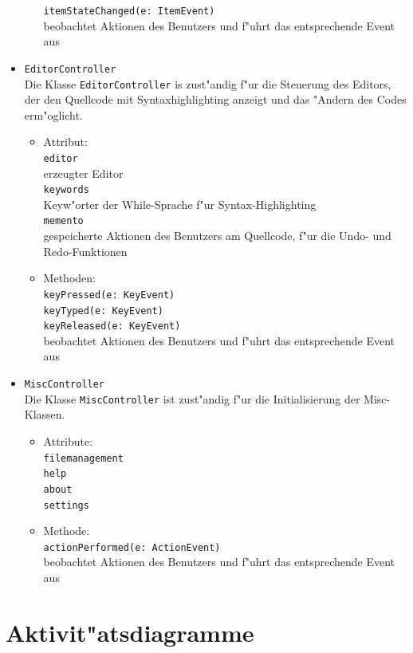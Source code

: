\documentclass[10pt,a4paper,titlepage]{article}
\begin{document}
\begin{itemize}
\begin{itemize}
\texttt{itemStateChanged(e: ItemEvent)} \\
beobachtet Aktionen des Benutzers und f"uhrt das entsprechende Event aus
\end{itemize}
\item \texttt{EditorController} \\
Die Klasse \texttt{EditorController} is zust"andig f"ur die Steuerung des Editors, der den Quellcode mit Syntaxhighlighting anzeigt und das "Andern des Codes erm"oglicht.
\begin{itemize}
\item Attribut: \\
\texttt{editor} \\
erzeugter Editor \\
\texttt{keywords} \\
Keyw"orter der While-Sprache f"ur Syntax-Highlighting \\
\texttt{memento} \\
gespeicherte Aktionen des Benutzers am Quellcode, f"ur die Undo- und Redo-Funktionen
\item Methoden:\\
\texttt{keyPressed(e: KeyEvent)} \\
\texttt{keyTyped(e: KeyEvent)} \\
\texttt{keyReleased(e: KeyEvent)} \\
beobachtet Aktionen des Benutzers und f"uhrt das entsprechende Event aus
\end{itemize}
\item \texttt{MiscController} \\
Die Klasse \texttt{MiscController} ist zust"andig f"ur die Initialisierung der Misc-Klassen. 
\begin{itemize}
\item Attribute: \\
\texttt{filemanagement} \\
\texttt{help} \\
\texttt{about} \\
\texttt{settings}
\item Methode: \\
\texttt{actionPerformed(e: ActionEvent)} \\
beobachtet Aktionen des Benutzers und f"uhrt das entsprechende Event aus
\end{itemize}
\end{itemize}

\newpage

\section{Aktivit"atsdiagramme}
\end{document}
